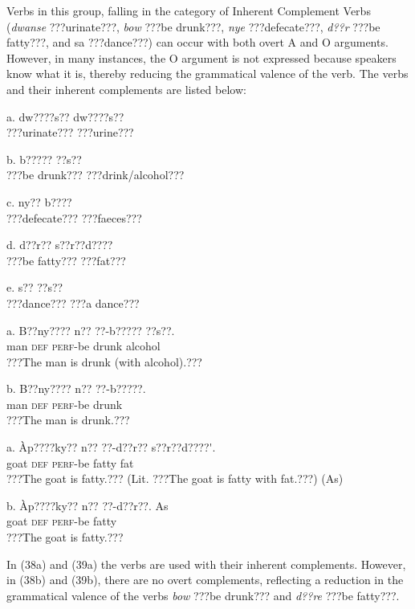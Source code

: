 \documentclass[output=paper]{langsci/langscibook}
\begin{document}
Verbs in this group, falling in the category of Inherent Complement Verbs (\emph{dwanse} ???urinate???, \emph{bow} ???be drunk???, \emph{nye} ???defecate???, \emph{d??r} ???be fatty???, and sa ???dance???) can occur with both overt A and O arguments. However, in many instances, the O argument is not expressed because speakers know what it is, thereby reducing the grammatical valence of the verb. The verbs and their inherent complements are listed below:


\ea
a.  dw????s??   dw????s??\\
\glt   ???urinate???  ???urine???
\z

\ea
b.  b?????    ??s??\\
\glt   ???be drunk???  ???drink/alcohol???
\z

\ea
c.  ny??    b????\\
\glt   ???defecate???  ???faeces???
\z

\ea
d.  d??r??    s??r??d????\\
\glt   ???be fatty???  ???fat???
\z

\ea
e.  s??    ??s??\\
\glt   ???dance???    ???a dance???
\z

\ea
\gll a.  B??ny????  n??  ??-b?????    ??s??.\\
       man  \textsc{def}  \textsc{perf}{}-be drunk  alcohol\\
\glt ???The man is drunk (with alcohol).???
\z

\ea
\gll  b.  B??ny????  n??  ??-b?????.\\
       man  \textsc{def}  \textsc{perf}{}-be drunk\\
\glt ???The man is drunk.???
\z

\ea
\gll a.  \`{A}p????ky??  n??  ??-d??r??      s??r??d????\'{ }.\\
       goat    \textsc{def}  \textsc{perf}{}-be fatty    fat\\
\glt   ???The goat is fatty.??? (Lit. ???The goat is fatty with fat.???) (As)
\z

\ea
\gll  b.  \`{A}p????ky??  n??  ??-d??r??.      As\\
       goat    \textsc{def}  \textsc{perf}{}-be fatty  \\
\glt   ???The goat is fatty.???
\z

In (38a) and (39a) the verbs are used with their inherent complements. However, in (38b) and (39b), there are no overt complements, reflecting a reduction in the grammatical valence of the verbs \emph{bow} ???be drunk??? and \emph{d??re} ???be fatty???.
\end{document}
